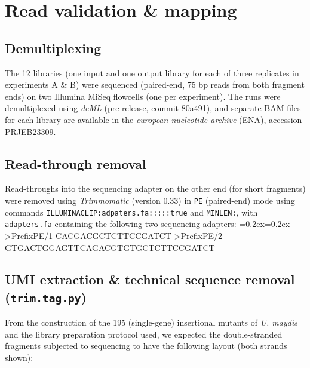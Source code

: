 \documentclass[a4paper,11pt,oneside]{amsart}
\title{\titletext{S1 Supporting Methods:}\captiontext{iPool-Seq Analysis Pipeline Description}}
\newenvironment{code}%
   {\bgroup\topsep=0.2ex\partopsep=0.2ex\shaded\verbatim}%
   {\endverbatim\endshaded\egroup}
\DeclareRobustCommand{\titletext}[1]{#1\\}
\begin{document}
\maketitle
\DeclareRobustCommand{\titletext}[1]{}

\section{Read validation \& mapping}

\subsection*{Demultiplexing}

The 12 libraries (one input and one output library for each of three replicates in experiments A \& B) were sequenced (paired-end, 75 bp reads from both fragment ends) on two Illumina MiSeq flowcells (one per experiment). The runs were demultiplexed using \textit{deML}\cite{Renaud2015} (pre-release, commit 80a491), and separate BAM files for each library are available in the \emph{european nucleotide archive} (ENA), accession PRJEB23309.

\subsection*{Read-through removal}

Read-throughs into the sequencing adapter on the other end (for short fragments) were removed using \textit{Trimmomatic}\cite{Bolger2014}  (version 0.33) in \texttt{PE} (paired-end) mode using commands \texttt{ILLUMINACLIP:\allowbreak adpaters.fa:::::\allowbreak true} and \texttt{MINLEN:}, with \texttt{adapters.fa} containing the following two sequencing adapters:
\begin{code}
>PrefixPE/1
CACGACGCTCTTCCGATCT
>PrefixPE/2
GTGACTGGAGTTCAGACGTGTGCTCTTCCGATCT
\end{code}

\subsection*{UMI extraction \& technical sequence removal (\texttt{trim.tag.py})}

From the construction of the 195 (single-gene) insertional mutants of \textit{U. maydis} and the library preparation protocol used, we expected the double-stranded fragments subjected to sequencing to have the following layout (both strands shown):
\end{document}
